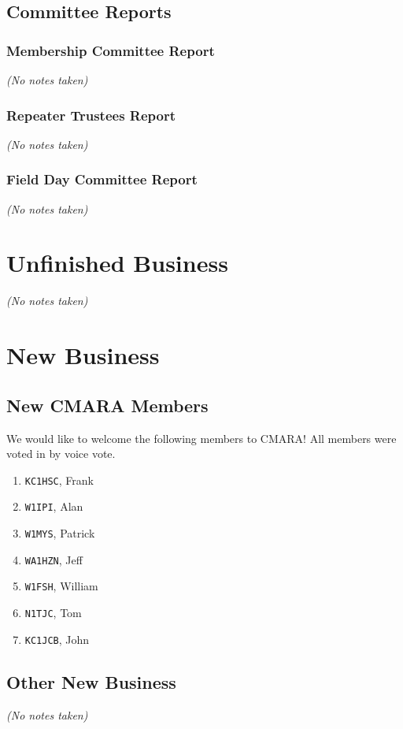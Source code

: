 \documentclass[10pt,letterpaper]{article}
\begin{document}
\subsection{Committee Reports}

\subsubsection{Membership Committee Report}
\emph{(No notes taken)}

\subsubsection{Repeater Trustees Report}
\emph{(No notes taken)}

\subsubsection{Field Day Committee Report}
\emph{(No notes taken)}

\section{Unfinished Business}
\emph{(No notes taken)}

\section{New Business}

\subsection{New CMARA Members}
\label{new-cmara-members}
We would like to welcome the following members to CMARA! All members were voted in by voice vote.
\begin{enumerate}
  \item \texttt{KC1HSC}, Frank
  \item \texttt{W1IPI}, Alan
  \item \texttt{W1MYS}, Patrick
  \item \texttt{WA1HZN}, Jeff
  \item \texttt{W1FSH}, William
  \item \texttt{N1TJC}, Tom
  \item \texttt{KC1JCB}, John
\end{enumerate}

\subsection{Other New Business}
\emph{(No notes taken)}
\end{document}
